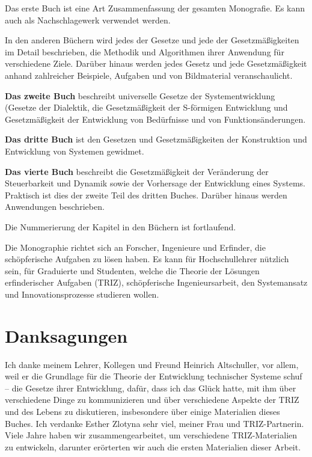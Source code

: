\documentclass[11pt,a4paper]{article}
\begin{document}
Das erste Buch ist eine Art Zusammenfassung der gesamten Monografie. Es kann
auch als Nachschlagewerk verwendet werden.

In den anderen Büchern wird jedes der Gesetze und jede der Gesetzmäßigkeiten
im Detail beschrieben, die Methodik und Algorithmen ihrer Anwendung für
verschiedene Ziele. Darüber hinaus werden jedes Gesetz und jede
Gesetzmäßigkeit anhand zahlreicher Beispiele, Aufgaben und von Bildmaterial
veranschaulicht.

\textbf{Das zweite Buch} beschreibt universelle Gesetze der Systementwicklung
(Gesetze der Dialektik, die Gesetzmäßigkeit der S-förmigen Entwicklung und
Gesetzmäßigkeit der Entwicklung von Bedürfnisse und von Funktionsänderungen.

\textbf{Das dritte Buch} ist den Gesetzen und Gesetzmäßigkeiten der
Konstruktion und Entwicklung von Systemen gewidmet.

\textbf{Das vierte Buch} beschreibt die Gesetzmäßigkeit der Veränderung der
Steuerbarkeit und Dynamik sowie der Vorhersage der Entwicklung eines Systems.
Praktisch ist dies der zweite Teil des dritten Buches. Darüber hinaus werden
Anwendungen beschrieben.

Die Nummerierung der Kapitel in den Büchern ist fortlaufend.

Die Monographie richtet sich an Forscher, Ingenieure und Erfinder, die
schöpferische Aufgaben zu lösen haben. Es kann für Hochschullehrer nützlich
sein, für Graduierte und Studenten, welche die Theorie der Lösungen
erfinderischer Aufgaben (TRIZ), schöpferische Ingenieursarbeit, den
Systemansatz und Innovationsprozesse studieren wollen.

\section*{Danksagungen}

Ich danke meinem Lehrer, Kollegen und Freund Heinrich Altschuller, vor allem,
weil er die Grundlage für die Theorie der Entwicklung technischer Systeme
schuf -- die Gesetze ihrer Entwicklung, dafür, dass ich das Glück hatte, mit
ihm über verschiedene Dinge zu kommunizieren und über verschiedene Aspekte der
TRIZ und des Lebens zu diskutieren, insbesondere über einige Materialien
dieses Buches.
\newpage
Ich verdanke Esther Zlotyna sehr viel, meiner Frau und TRIZ-Partnerin.  Viele
Jahre haben wir zusammengearbeitet, um verschiedene TRIZ-Materialien zu
entwickeln, darunter erörterten wir auch die ersten Materialien dieser Arbeit.
\end{document}
